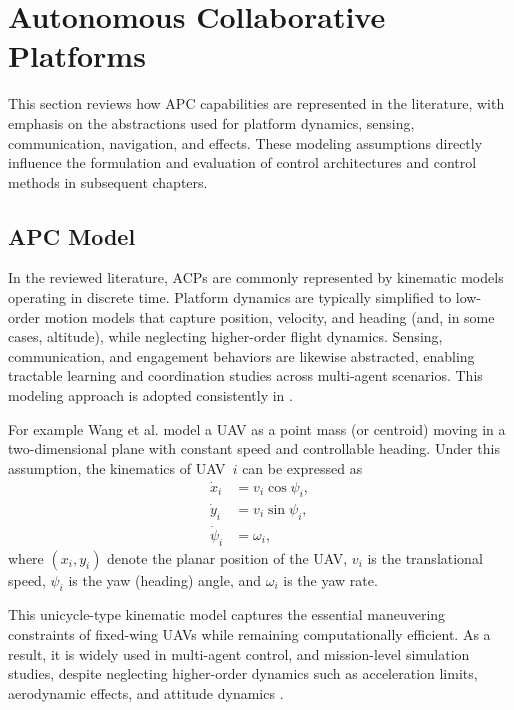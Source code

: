 \section{Autonomous Collaborative Platforms}
This section reviews how APC capabilities are represented in the literature, with emphasis on the abstractions used for platform dynamics, sensing, communication, navigation, and effects. These modeling assumptions directly influence the formulation and evaluation of control architectures and control methods in subsequent chapters.

\subsection{APC Model}
In the reviewed literature, ACPs are commonly represented by kinematic models operating in discrete time. Platform dynamics are typically simplified to low-order motion models that capture position, velocity, and heading (and, in some cases, altitude), while neglecting higher-order flight dynamics. Sensing, communication, and engagement behaviors are likewise abstracted, enabling tractable learning and coordination studies across multi-agent scenarios. This modeling approach is adopted consistently in  \cite{yue2022uav_sead_hmarl,Fang2021CollaborativeCombat,Lee2023MUMTSEAD,xu2025mdrl_uav_combat,Wang2025CooperativeUAV,yuksek2021cooperative, Jiang2025DDPGSwarmTaskPlanning, Fang2021CollaborativeCombat}.

For example Wang et al. \cite{Wang2025CooperativeUAV} model a UAV as a point mass (or centroid) moving in a two-dimensional plane with constant speed and controllable heading. Under this assumption, the kinematics of UAV~$i$ can be expressed as
\begin{equation}
\begin{aligned}
\dot{x}_i &= v_i \cos \psi_i, \\
\dot{y}_i &= v_i \sin \psi_i, \\
\dot{\psi}_i &= \omega_i,
\end{aligned}
\label{eq:unicycle_model}
\end{equation}
where $(x_i, y_i)$ denote the planar position of the UAV, $v_i$ is the translational speed, $\psi_i$ is the yaw (heading) angle, and $\omega_i$ is the yaw rate. 

This unicycle-type kinematic model captures the essential maneuvering constraints of fixed-wing UAVs while remaining computationally efficient. As a result, it is widely used in multi-agent control, and mission-level simulation studies, despite neglecting higher-order dynamics such as acceleration limits, aerodynamic effects, and attitude dynamics \cite{yue2022uav_sead_hmarl,Fang2021CollaborativeCombat,Lee2023MUMTSEAD,xu2025mdrl_uav_combat,Wang2025CooperativeUAV,yuksek2021cooperative, Jiang2025DDPGSwarmTaskPlanning, Fang2021CollaborativeCombat}.

